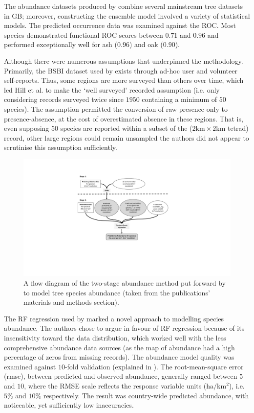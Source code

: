 The abundance datasets produced by \cite{hill.data} combine several mainstream tree datasets in GB; moreover, 
constructing the ensemble model involved a variety of statistical models.
The predicted occurrence data was examined against the ROC.
Most species demonstrated functional ROC scores between $0.71$ and $0.96$ and performed exceptionally
well for ash ($0.96$) and oak ($0.90$).  

Although there were numerous assumptions that underpinned the methodology.
Primarily, the BSBI dataset used by \cite{hill.data} exists through ad-hoc user and volunteer self-reports.
Thus, some regions are more surveyed than others over time, which led Hill et al. to make the 
`well surveyed' recorded assumption (i.e. only considering records surveyed twice since $1950$ containing a minimum of $50$ species).
The assumption permitted the conversion of raw presence-only to presence-absence, 
at the cost of overestimated absence in these regions. That is, even supposing $50$ species
are reported within a subset of the ($\mathrm{2km \times 2km}$ tetrad) record, other large regions could remain unsampled\textemdash
the authors did not appear to scrutinise this assumption sufficiently.

\begin{figure}
    \centering
    \includegraphics[scale=0.55]{chapter2/figures/hill-method-fig.pdf}
    \caption{A flow diagram of the two-stage abundance method put forward by \cite{hill.data} to model tree species abundance  
    (taken from the publications' materials and methods section).}
    \label{fig:hill-method}
\end{figure}

The RF regression used by \cite{hill.data} marked a novel approach to modelling species abundance.
The authors chose to argue in favour of RF regression because of its insensitivity toward the data distribution,
which worked well with the less comprehensive abundance data sources (as the map of abundance had a high percentage of zeros from missing records).
The abundance model quality was examined against $10$-fold validation (explained in \cite{refaeilzadeh2009cross}).
The root-mean-square error (\acrshort{rmse}), between predicted and observed abundance, generally ranged between $5$ and $10$,
where the RMSE scale reflects the response variable units ($\mathrm{ha/km^2}$), i.e. $5\%$ and $10\%$ respectively.
The result was country-wide predicted abundance, with noticeable, yet sufficiently low inaccuracies.

